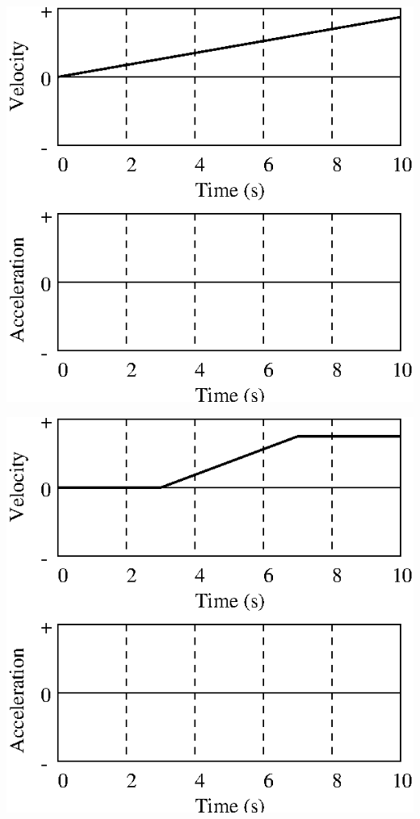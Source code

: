 \vspace{0.3cm}
{\par\centering \includegraphics{changing_fig8.eps} \par}
\vspace{0.3cm}

\vspace{0.3cm}
{\par\centering \includegraphics{changing_fig9.eps} \par}
\vspace{0.3cm}

